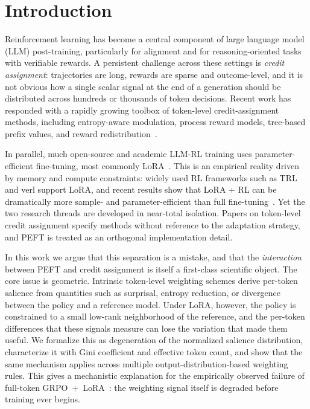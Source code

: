 \section{Introduction}

Reinforcement learning has become a central component of large language model
(LLM) post-training, particularly for alignment and for reasoning-oriented
tasks with verifiable rewards. A persistent challenge across these settings is
\emph{credit assignment}: trajectories are long, rewards are sparse and
outcome-level, and it is not obvious how a single scalar signal at the end of
a generation should be distributed across hundreds or thousands of token
decisions. Recent work has responded with a rapidly growing toolbox of
token-level credit-assignment methods, including entropy-aware modulation,
process reward models, tree-based prefix values, and reward
redistribution~\citep{cui2025prime,li2024red,tran2025tempo,wang2025beyond8020,he2026eapo,yu2026erpo,kazemnejad2024vineppo}.

In parallel, much open-source and academic LLM-RL training uses
parameter-efficient fine-tuning, most commonly LoRA~\citep{hu2021lora}. This
is an empirical reality driven by memory and compute constraints: widely used
RL frameworks such as TRL and verl support LoRA, and recent results show that
LoRA + RL can be dramatically more sample- and parameter-efficient than full
fine-tuning~\citep{wang2025tina}. Yet
the two research threads are developed in near-total isolation. Papers on
token-level credit assignment specify methods without reference to the
adaptation strategy, and PEFT is treated as an orthogonal implementation
detail.

In this work we argue that this separation is a mistake, and that the
\emph{interaction} between PEFT and credit assignment is itself a first-class
scientific object. The core issue is geometric. Intrinsic token-level
weighting schemes derive per-token salience from quantities such as
surprisal, entropy reduction, or divergence between the policy and a reference
model. Under LoRA, however, the policy is constrained to a small low-rank
neighborhood of the reference, and the per-token differences that these
signals measure can lose the variation that made them useful. We formalize
this as degeneration of the normalized salience distribution, characterize it
with Gini coefficient and effective token count, and
show that the same mechanism applies across multiple
output-distribution-based weighting rules. This gives a mechanistic
explanation for the empirically observed failure of full-token
GRPO~+~LoRA~\citep{lee2025tokenefficientrl}: the weighting signal itself is
degraded before training ever begins.

